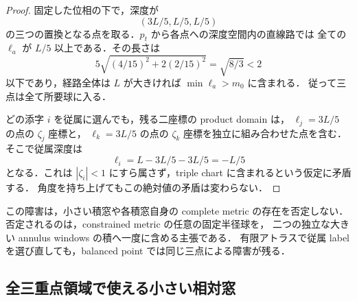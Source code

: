 \begin{proof}
固定した位相の下で，深度が
\[
 (3L/5,L/5,L/5)
\]
の三つの置換となる点を取る．$p_t$ から各点への深度空間内の直線路では
全ての $\ell_a$ が $L/5$ 以上である．その長さは
\[
 5\sqrt{(4/15)^2+2(2/15)^2}
 =\sqrt{8/3}<2
\]
以下であり，経路全体は $L$ が大きければ $\min\ell_a>m_0$ に含まれる．
従って三点は全て所要球に入る．

どの添字 $i$ を従属に選んでも，残る二座標の product domain は，
$\ell_j=3L/5$ の点の $\zeta_j$ 座標と，
$\ell_k=3L/5$ の点の $\zeta_k$ 座標を独立に組み合わせた点を含む．
そこで従属深度は
\[
 \ell_i=L-3L/5-3L/5=-L/5
\]
となる．これは $|\zeta_i|<1$ にすら属さず，triple chart に含まれるという仮定に矛盾する．
角度を持ち上げてもこの絶対値の矛盾は変わらない．
\end{proof}

\begin{remark}\label{coarse:rem:triple-product-obstruction-scope}
この障害は，小さい積窓や各積窓自身の complete metric の存在を否定しない．
否定されるのは，constrained metric の任意の固定半径球を，
二つの独立な大きい annulus windows の積へ一度に含める主張である．
有限アトラスで従属 label を選び直しても，balanced point では同じ三点による障害が残る．
\end{remark}

\subsection{全三重点領域で使える小さい相対窓}

